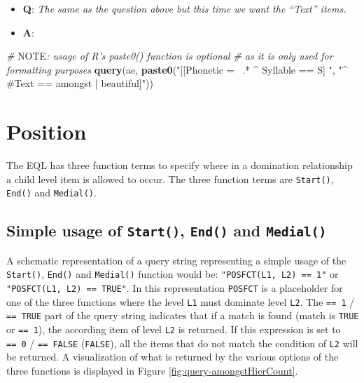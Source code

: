 \documentclass[]{book}
\newenvironment{Shaded}{\begin{snugshade}}{\end{snugshade}}
\newcommand{\AlertTok}[1]{\textcolor[rgb]{0.94,0.16,0.16}{#1}}
\newcommand{\CommentTok}[1]{\textcolor[rgb]{0.56,0.35,0.01}{\textit{#1}}}
\newcommand{\KeywordTok}[1]{\textcolor[rgb]{0.13,0.29,0.53}{\textbf{#1}}}
\newcommand{\NormalTok}[1]{#1}
\newcommand{\StringTok}[1]{\textcolor[rgb]{0.31,0.60,0.02}{#1}}
\providecommand{\tightlist}{%
  \setlength{\itemsep}{0pt}\setlength{\parskip}{0pt}}
\theoremstyle{definition}
\theoremstyle{definition}
\theoremstyle{definition}
\theoremstyle{remark}
\begin{document}
\begin{itemize}
\tightlist
\item
  \textbf{Q}: \emph{The same as the question above but this time we want
  the ``Text'' items.}
\item
  \textbf{A}:
\end{itemize}

\begin{Shaded}
\begin{Highlighting}[]
\CommentTok{# }\AlertTok{NOTE}\CommentTok{: usage of R's paste0() function is optional}
\CommentTok{# as it is only used for formatting purposes}
\KeywordTok{query}\NormalTok{(ae, }\KeywordTok{paste0}\NormalTok{(}\StringTok{"[[Phonetic =~ .* ^ Syllable == S] "}\NormalTok{,}
                 \StringTok{"^ #Text == amongst | beautiful]"}\NormalTok{))}
\end{Highlighting}
\end{Shaded}

\hypertarget{position}{%
\section{Position}\label{position}}

The EQL has three function terms to specify where in a domination
relationship a child level item is allowed to occur. The three function
terms are \texttt{Start()}, \texttt{End()} and \texttt{Medial()}.

\hypertarget{simple-usage-of-start-end-and-medial}{%
\subsection{\texorpdfstring{Simple usage of \texttt{Start()},
\texttt{End()} and
\texttt{Medial()}}{Simple usage of Start(), End() and Medial()}}\label{simple-usage-of-start-end-and-medial}}

A schematic representation of a query string representing a simple usage
of the \texttt{Start()}, \texttt{End()} and \texttt{Medial()} function
would be: \texttt{"POSFCT(L1,\ L2)\ ==\ 1"} or
\texttt{"POSFCT(L1,\ L2)\ ==\ TRUE"}. In this representation
\texttt{POSFCT} is a placeholder for one of the three functions where
the level \texttt{L1} must dominate level \texttt{L2}. The
\texttt{==\ 1} / \texttt{==\ TRUE} part of the query string indicates
that if a match is found (match is \texttt{TRUE} or \texttt{==\ 1}), the
according item of level \texttt{L2} is returned. If this expression is
set to \texttt{==\ 0} / \texttt{==\ FALSE} (\texttt{FALSE}), all the
items that do not match the condition of \texttt{L2} will be returned. A
visualization of what is returned by the various options of the three
functions is displayed in Figure \ref{fig:query-amongstHierCount}.
\end{document}
